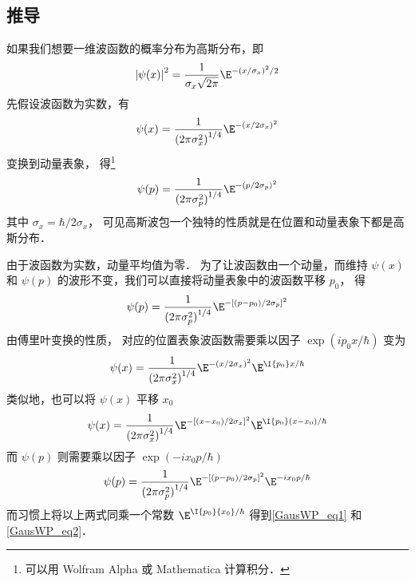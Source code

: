 \subsection{推导}

如果我们想要一维波函数的概率分布为高斯分布，即
\begin{equation}
{\left| {\psi (x)} \right|^2} = \frac{1}{{\sigma_x \sqrt {2\pi } }}{\E^{ - {{(x/\sigma_x )}^2}/2}}
\end{equation}
先假设波函数为实数，有
\begin{equation}
\psi (x) = \frac{1}{{{{(2\pi {\sigma_x ^2})}^{1/4}}}}{\E^{ - {{(x/2\sigma_x )}^2}}}
\end{equation}
变换到动量表象，%
得\footnote{可以用 Wolfram Alpha 或 Mathematica 计算积分．}
\begin{equation}
\psi (p) = \frac{1}{{{{(2\pi {\sigma_p ^2})}^{1/4}}}}{\E^{ - {{(p/2\sigma_p )}^2}}}
\end{equation}
其中 ${\sigma_x} = \hbar /2{\sigma_x}$， %
可见高斯波包一个独特的性质就是在位置和动量表象下都是高斯分布．

由于波函数为实数，动量平均值为零．%
为了让波函数由一个动量，而维持 $\psi(x)$ 和 $\psi(p)$ %
的波形不变，我们可以直接将动量表象中的波函数平移 $p_0$， 得
\begin{equation}
\psi (p) = \frac{1}{{{{(2\pi \sigma_p^2)}^{1/4}}}}{\E^{ - {{[(p - {p_0})/2{\sigma_p}]}^2}}}
\end{equation}
由傅里叶变换的性质，%
对应的位置表象波函数需要乘以因子 $\exp(i p_0 x/\hbar)$ 变为
\begin{equation}
\psi (x) = \frac{1}{{{{(2\pi {\sigma_x ^2})}^{1/4}}}}{\E^{ - {{(x/2\sigma_x )}^2}}}{\E^{\I {{{p_0}}}x/{\hbar }}}
\end{equation}
类似地，也可以将 $\psi(x)$ 平移 $x_0$ 
\begin{equation}
\psi (x) = \frac{1}{{{{(2\pi {\sigma_x ^2})}^{1/4}}}}{\E^{ - {{[(x-x_0)/2\sigma_x ]}^2}}}{\E^{\I {{{p_0}}}(x-x_0)/{\hbar }}}
\end{equation}
而 $\psi(p)$ 则需要乘以因子 $\exp ( - i{x_0}p/\hbar )$
\begin{equation}
\psi (p) = \frac{1}{{{{(2\pi \sigma_p^2)}^{1/4}}}}{\E^{ - {{[(p - {p_0})/2{\sigma_p}]}^2}}}{\E^{ - i{x_0}p/\hbar }}
\end{equation}
而习惯上将以上两式同乘一个常数%
 ${\E^{\I{p_0}{x_0}/\hbar }}$ 得到\autoref{GausWP_eq1} 和\autoref{GausWP_eq2}． 


